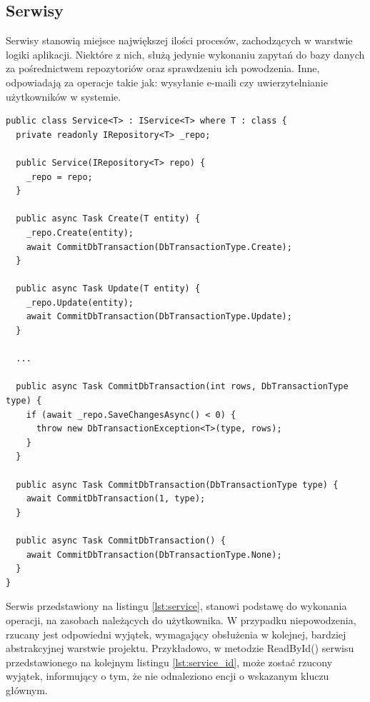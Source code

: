 \subsection{Serwisy}

Serwisy stanowią miejsce największej ilości procesów, zachodzących w warstwie logiki aplikacji. Niektóre z nich, służą jedynie wykonaniu zapytań do bazy danych za pośrednictwem repozytoriów oraz sprawdzeniu ich powodzenia. Inne, odpowiadają za operacje takie jak: wysyłanie e-maili czy uwierzytelnianie użytkowników w systemie.

\begin{lstlisting}[language=CSharp, caption=Fragment generycznej klasy serwisu operującego na encjach zasobów, label=lst:service]
public class Service<T> : IService<T> where T : class {
  private readonly IRepository<T> _repo;

  public Service(IRepository<T> repo) {
    _repo = repo;
  }

  public async Task Create(T entity) {
    _repo.Create(entity);
    await CommitDbTransaction(DbTransactionType.Create);
  }

  public async Task Update(T entity) {
    _repo.Update(entity);
    await CommitDbTransaction(DbTransactionType.Update);
  }

  ...

  public async Task CommitDbTransaction(int rows, DbTransactionType type) {
    if (await _repo.SaveChangesAsync() < 0) {
      throw new DbTransactionException<T>(type, rows);
    }
  }

  public async Task CommitDbTransaction(DbTransactionType type) {
    await CommitDbTransaction(1, type);
  }

  public async Task CommitDbTransaction() {
    await CommitDbTransaction(DbTransactionType.None);
  }
}
\end{lstlisting}

Serwis przedstawiony na listingu \ref{lst:service}, stanowi podstawę do wykonania operacji, na zasobach należących do użytkownika. W przypadku niepowodzenia, rzucany jest odpowiedni wyjątek, wymagający obsłużenia w kolejnej, bardziej abstrakcyjnej warstwie projektu. Przykładowo, w metodzie ReadById() serwisu przedstawionego na kolejnym listingu \ref{lst:service_id}, może zostać rzucony wyjątek, informujący o tym, że nie odnaleziono encji o wskazanym kluczu głównym.

